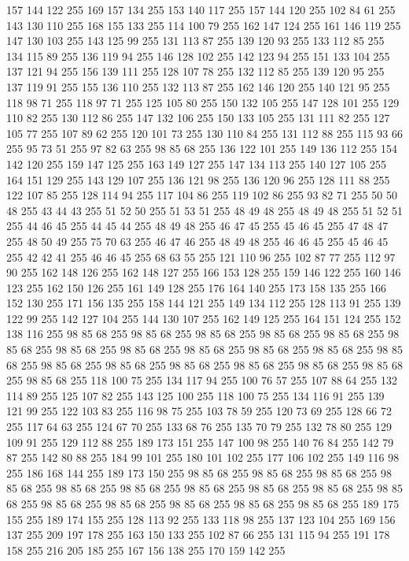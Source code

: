 157 144 122 255 169 157 134 255 153 140 117 255 157 144 120 255 102 84 61 255 143 130 110 255 168 155 133 255 114 100 79 255 162 147 124 255 161 146 119 255 147 130 103 255 143 125 99 255 131 113 87 255 139 120 93 255 133 112 85 255 134 115 89 255 136 119 94 255 146 128 102 255 142 123 94 255 151 133 104 255 137 121 94 255 156 139 111 255 128 107 78 255 132 112 85 255 139 120 95 255 137 119 91 255 155 136 110 255 132 113 87 255 162 146 120 255 140 121 95 255 118 98 71 255 118 97 71 255 125 105 80 255 150 132 105 255 147 128 101 255 129 110 82 255 130 112 86 255 147 132 106 255 150 133 105 255 131 111 82 255 127 105 77 255 107 89 62 255 120 101 73 255 130 110 84 255 131 112 88 255 115 93 66 255 95 73 51 255 97 82 63 255 98 85 68 255 136 122 101 255 149 136 112 255 154 142 120 255 159 147 125 255 163 149 127 255 147 134 113 255 140 127 105 255 164 151 129 255 143 129 107 255 136 121 98 255 136 120 96 255 128 111 88 255 122 107 85 255 128 114 94 255 117 104 86 255
119 102 86 255 93 82 71 255 50 50 48 255 43 44 43 255 51 52 50 255 51 53 51 255 48 49 48 255 48 49 48 255 51 52 51 255 44 46 45 255 44 45 44 255 48 49 48 255 46 47 45 255 45 46 45 255 47 48 47 255 48 50 49 255 75 70 63 255 46 47 46 255 48 49 48 255 46 46 45 255 45 46 45 255 42 42 41 255 46 46 45 255 68 63 55 255 121 110 96 255 102 87 77 255 112 97 90 255 162 148 126 255 162 148 127 255 166 153 128 255 159 146 122 255 160 146 123 255 162 150 126 255 161 149 128 255 176 164 140 255 173 158 135 255 166 152 130 255 171 156 135 255 158 144 121 255 149 134 112 255 128 113 91 255 139 122 99 255 142 127 104 255 144 130 107 255 162 149 125 255 164 151 124 255 152 138 116 255 98 85 68 255 98 85 68 255 98 85 68 255 98 85 68 255 98 85 68 255 98 85 68 255 98 85 68 255 98 85 68 255 98 85 68 255 98 85 68 255 98 85 68 255 98 85 68 255 98 85 68 255 98 85 68 255 98 85 68 255 98 85 68 255 98 85 68 255
98 85 68 255 98 85 68 255 118 100 75 255 134 117 94 255 100 76 57 255 107 88 64 255 132 114 89 255 125 107 82 255 143 125 100 255 118 100 75 255 134 116 91 255 139 121 99 255 122 103 83 255 116 98 75 255 103 78 59 255 120 73 69 255 128 66 72 255 117 64 63 255 124 67 70 255 133 68 76 255 135 70 79 255 132 78 80 255 129 109 91 255 129 112 88 255 189 173 151 255 147 100 98 255 140 76 84 255 142 79 87 255 142 80 88 255 184 99 101 255 180 101 102 255 177 106 102 255 149 116 98 255 186 168 144 255 189 173 150 255 98 85 68 255 98 85 68 255 98 85 68 255 98 85 68 255 98 85 68 255 98 85 68 255 98 85 68 255 98 85 68 255 98 85 68 255 98 85 68 255 98 85 68 255 98 85 68 255 98 85 68 255 98 85 68 255 98 85 68 255 189 175 155 255 189 174 155 255 128 113 92 255 133 118 98 255 137 123 104 255 169 156 137 255 209 197 178 255 163 150 133 255 102 87 66 255 131 115 94 255 191 178 158 255 216 205 185 255 167 156 138 255 170 159 142 255
